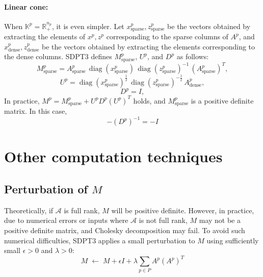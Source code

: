 \documentclass{scrartcl}
\begin{document}
\paragraph{Linear cone:}

When $\mathbb{K}^p = \mathbb{R}^{n_p}_+$, it is even simpler.
Let $x^p_{\mathrm{sparse}}, z^p_{\mathrm{sparse}}$ be the vectors obtained by extracting the elements of $x^p, z^p$ corresponding to the sparse columns of $A^p$, and $x^p_{\mathrm{dense}}, z^p_{\mathrm{dense}}$ be the vectors obtained by extracting the elements corresponding to the dense columns.
SDPT3 defines $M^p_{\mathrm{sparse}}$, $U^p$, and $D^p$ as follows:
\[
   M^p_{\mathrm{sparse}}
   = A^p_{\mathrm{sparse}}
     \,\operatorname{diag}(x^p_{\mathrm{sparse}})
     \,\operatorname{diag}(z^p_{\mathrm{sparse}})^{-1}
     \,(A^p_{\mathrm{sparse}})^T,
\]
\[
   U^p
   = \operatorname{diag}(x^p_{\mathrm{sparse}})^{\tfrac12}
     \,\operatorname{diag}(z^p_{\mathrm{sparse}})^{-\tfrac12}
     \,A^p_{\mathrm{dense}},
\]
\[ D^p = I, \]
In practice, $M^p = M^p_{\mathrm{sparse}} + U^p D^p (U^p)^T$ holds, and $M^p_{\mathrm{sparse}}$ is a positive definite matrix.
In this case,
\[-(D^p)^{-1} = -I\]

\medskip

\section{Other computation techniques}

\subsection{Perturbation of \boldmath $M$ }

Theoretically, if $\mathcal{A}$ is full rank, $M$ will be positive definite. However, in practice, due to numerical errors or inputs where $\mathcal{A}$ is not full rank, $M$ may not be a positive definite matrix, and Cholesky decomposition may fail.  
To avoid such numerical difficulties, SDPT3 applies a small perturbation to $M$ using sufficiently small $\epsilon > 0$ and $\lambda > 0$:
\[
  M \;\leftarrow\; M + \epsilon I + \lambda \sum_{p\in P} A^p (A^p)^T
\]
\end{document}
